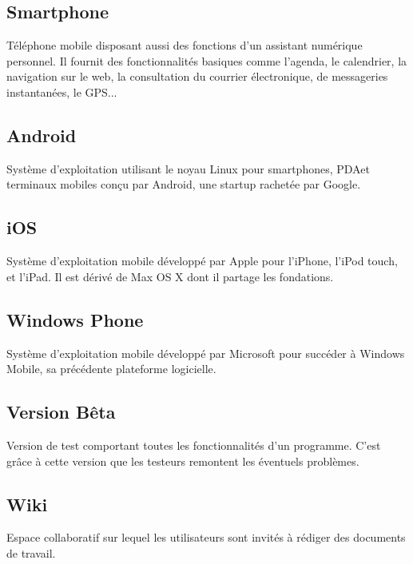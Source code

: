 \documentclass{life-fr}
\begin{document}
\subsection{ Smartphone}
Téléphone mobile disposant aussi des fonctions d'un assistant numérique personnel. Il fournit des fonctionnalités basiques comme l'agenda, le calendrier, la navigation sur le web, la consultation du courrier électronique, de messageries instantanées, le GPS...

\subsection{ Android}
Système d’exploitation utilisant le noyau Linux pour smartphones, PDAet terminaux mobiles conçu par Android, une startup rachetée par Google.

\subsection{ iOS}
Système d’exploitation mobile développé par Apple pour l'iPhone, l'iPod touch, et l'iPad. Il est dérivé de Max OS X dont il partage les fondations.

\subsection{ Windows Phone}
Système d’exploitation mobile développé par Microsoft pour succéder à Windows Mobile, sa précédente plateforme logicielle.

\subsection{ Version Bêta}
Version de test comportant toutes les fonctionnalités d'un programme. C'est grâce à cette version que les testeurs remontent les éventuels problèmes.

\subsection{ Wiki}
Espace collaboratif sur lequel les utilisateurs sont invités à rédiger des documents de travail.
\end{document}
